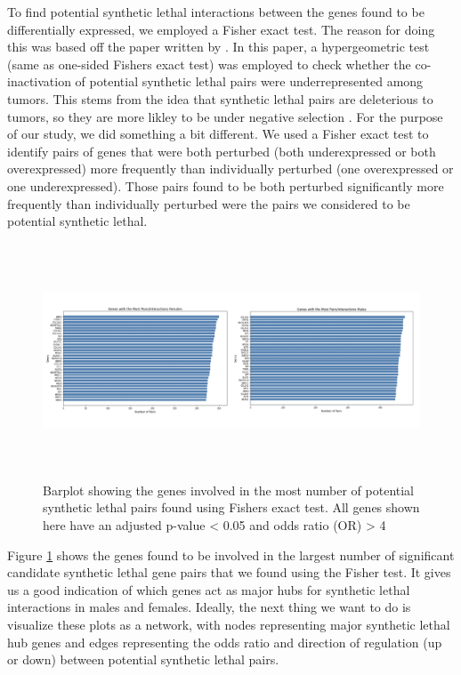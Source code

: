 \documentclass[10pt]{article}
\providecommand{\figref}[1]{Figure \ref{#1}}  %
\begin{document}
	To find potential synthetic lethal interactions between the genes found to be differentially expressed, we employed a Fisher exact test. The reason for doing this was based off the paper written by \citet{lee2018harnessing}. In this paper, a hypergeometric test (same as one-sided Fishers exact test) was employed to check whether the co-inactivation of potential synthetic lethal pairs were underrepresented among tumors. This stems from the idea that synthetic lethal pairs are deleterious to tumors, so they are more likley to be under negative selection \citep{lee2018harnessing}. For the purpose of our study, we did something a bit different. We used a Fisher exact test to identify pairs of genes that were both perturbed (both underexpressed or both overexpressed) more frequently than individually perturbed (one overexpressed or one underexpressed). Those pairs found to be both perturbed significantly more frequently than individually perturbed were the pairs we considered to be potential synthetic lethal.
	
	\begin{figure}[!h]
		\centering
		\includegraphics[width=\textwidth, height=7cm]{interactions_or4.png}
		\caption{Barplot showing the genes involved in the most number of potential synthetic lethal pairs found using Fishers exact test. All genes shown here have an adjusted p-value < 0.05 and odds ratio (OR) > 4}
		\label{fig:9}
	\end{figure}

	\figref{fig:9} shows the genes found to be involved in the largest number of significant candidate synthetic lethal gene pairs that we found using the Fisher test. It gives us a good indication of which genes act as major hubs for synthetic lethal interactions in males and females. Ideally, the next thing we want to do is visualize these plots as a network, with nodes representing major synthetic lethal hub genes and edges representing the odds ratio and direction of regulation (up or down) between potential synthetic lethal pairs.
	
\end{document}
